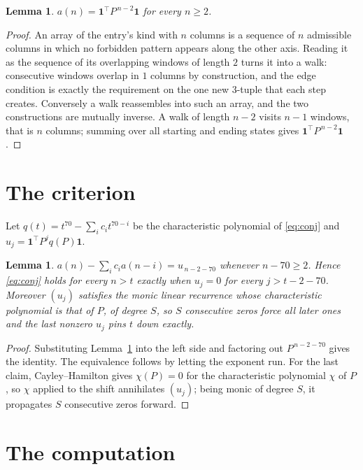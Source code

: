\documentclass[11pt,a4paper]{article}
\theoremstyle{plain}
\newtheorem{lemma}[theorem]{Lemma}
\theoremstyle{definition}
\begin{document}
\begin{lemma}\label{lem:walk}
$a(n)=\mathbf{1}^{\!\top}P^{\,n-2}\mathbf{1}$ for every $n\ge2$.
\end{lemma}

\begin{proof}
An array of the entry's kind with $n$ columns is a sequence of $n$ admissible columns in
which no forbidden pattern appears along the other axis. Reading it as the sequence of its
overlapping windows of length $2$ turns it into a walk: consecutive windows overlap in
$1$ columns by construction, and the edge condition is exactly the requirement on the one
new $3$-tuple that each step creates. Conversely a walk reassembles into such an array,
and the two constructions are mutually inverse. A walk of length $n-2$ visits $n-1$
windows, that is $n$ columns; summing over all starting and ending states gives
$\mathbf{1}^{\!\top}P^{\,n-2}\mathbf{1}$.
\end{proof}

\section{The criterion}

Let $q(t)=t^{70}-\sum_i c_i t^{70-i}$ be the characteristic polynomial of
\eqref{eq:conj} and $u_j=\mathbf{1}^{\!\top}P^{j}q(P)\mathbf{1}$.

\begin{lemma}\label{lem:crit}
$a(n)-\sum_i c_i a(n-i)=u_{\,n-2-70}$ whenever $n-70\ge2$. Hence
\eqref{eq:conj} holds for every $n>t$ exactly when $u_j=0$ for every
$j>t-2-70$. Moreover $(u_j)$ satisfies the monic linear recurrence whose
characteristic polynomial is that of $P$, of degree $S$, so $S$ consecutive zeros force all
later ones and the last nonzero $u_j$ pins $t$ down exactly.
\end{lemma}

\begin{proof}
Substituting Lemma~\ref{lem:walk} into the left side and factoring out
$P^{\,n-2-70}$ gives the identity. The equivalence follows by letting the exponent
run. For the last claim, Cayley--Hamilton gives $\chi(P)=0$ for the characteristic
polynomial $\chi$ of $P$, so $\chi$ applied to the shift annihilates $(u_j)$; being monic of
degree $S$, it propagates $S$ consecutive zeros forward.
\end{proof}

\section{The computation}
\end{document}
